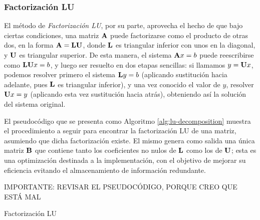         \subsubsection{Factorización LU}

            El método de \emph{Factorización LU}, por su parte, aprovecha el hecho de que bajo ciertas condiciones, una matriz $\mathbf{A}$ puede factorizarse como el producto de otras dos, en la forma $\mathbf{A} = \mathbf{L}\mathbf{U}$, donde $\mathbf{L}$ es triangular inferior con unos en la diagonal, y $\mathbf{U}$ es triangular superior. De esta manera, el sistema $\mathbf{A}x=b$ puede reescribirse como $\mathbf{L}\mathbf{U}x=b$, y luego ser resuelto en dos etapas sencillas: si llamamos $y=\mathbf{U}x$, podemos resolver primero el sistema $\mathbf{L}y=b$ (aplicando sustitución hacia adelante, pues $\mathbf{L}$ es triangular inferior), y una vez conocido el valor de $y$, resolver $\mathbf{U}x=y$ (aplicando esta vez sustitución hacia atrás), obteniendo así la solución del sistema original.

            El pseudocódigo que se presenta como Algoritmo \ref{alg:lu-decomposition} muestra el procedimiento a seguir para encontrar la factorización LU de una matriz, asumiendo que dicha factorización existe. El mismo genera como salida una única matriz $\mathbf{B}$ que contiene tanto los coeficientes no nulos de $\mathbf{L}$ como los de $\mathbf{U}$; esta es una optimización destinada a la implementación, con el objetivo de mejorar su eficiencia evitando el almacenamiento de información redundante.

            {\color{red}
                IMPORTANTE: REVISAR EL PSEUDOCÓDIGO, PORQUE CREO QUE ESTÁ MAL
            }

            \vspace{.5em}
            \begin{algorithm}[H]
                \caption{Factorización LU} \label{alg:lu-decomposition}
            \end{algorithm}
            \vspace{.5em}

